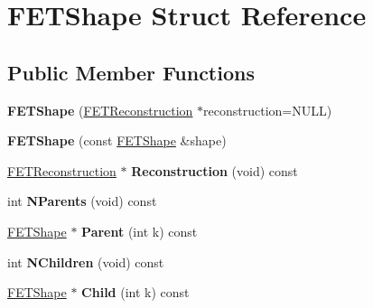 \hypertarget{struct_f_e_t_shape}{}\section{F\+E\+T\+Shape Struct Reference}
\label{struct_f_e_t_shape}
\subsection*{Public Member Functions}
\begin{DoxyCompactItemize}
\item 
{\bfseries F\+E\+T\+Shape} (\hyperlink{struct_f_e_t_reconstruction}{F\+E\+T\+Reconstruction} $\ast$reconstruction=N\+U\+LL)\hypertarget{struct_f_e_t_shape_a543018d830169557efed34a103373ca0}{}\label{struct_f_e_t_shape_a543018d830169557efed34a103373ca0}

\item 
{\bfseries F\+E\+T\+Shape} (const \hyperlink{struct_f_e_t_shape}{F\+E\+T\+Shape} \&shape)\hypertarget{struct_f_e_t_shape_a67082af825c9b66c017509253bc1a398}{}\label{struct_f_e_t_shape_a67082af825c9b66c017509253bc1a398}

\item 
\hyperlink{struct_f_e_t_reconstruction}{F\+E\+T\+Reconstruction} $\ast$ {\bfseries Reconstruction} (void) const \hypertarget{struct_f_e_t_shape_a6604c7f31f5445738c791e607334c185}{}\label{struct_f_e_t_shape_a6604c7f31f5445738c791e607334c185}

\item 
int {\bfseries N\+Parents} (void) const \hypertarget{struct_f_e_t_shape_ad991c05e94f4f5b96456243e23ee5934}{}\label{struct_f_e_t_shape_ad991c05e94f4f5b96456243e23ee5934}

\item 
\hyperlink{struct_f_e_t_shape}{F\+E\+T\+Shape} $\ast$ {\bfseries Parent} (int k) const \hypertarget{struct_f_e_t_shape_a44fb5ead33166ec01c38fd2a3f0f1566}{}\label{struct_f_e_t_shape_a44fb5ead33166ec01c38fd2a3f0f1566}

\item 
int {\bfseries N\+Children} (void) const \hypertarget{struct_f_e_t_shape_a229711d5ffd63ed7f383fbdfc65843ca}{}\label{struct_f_e_t_shape_a229711d5ffd63ed7f383fbdfc65843ca}

\item 
\hyperlink{struct_f_e_t_shape}{F\+E\+T\+Shape} $\ast$ {\bfseries Child} (int k) const \hypertarget{struct_f_e_t_shape_a13ca7109ce1e1c7efc36c53de26fbdce}{}\label{struct_f_e_t_shape_a13ca7109ce1e1c7efc36c53de26fbdce}


\end{DoxyCompactItemize}
